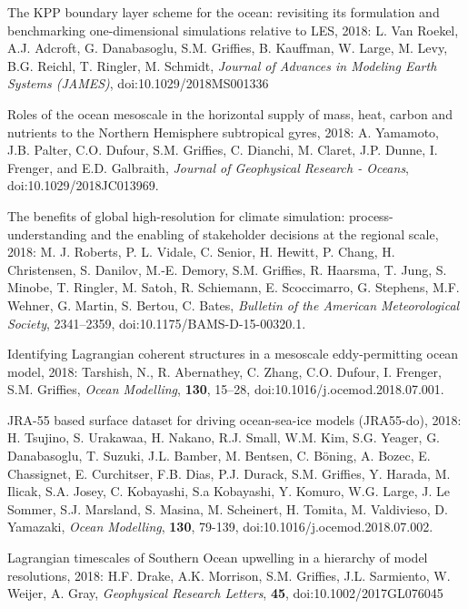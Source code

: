 \begin{etaremune}
\item The KPP boundary layer scheme for the ocean: revisiting its formulation and benchmarking one-dimensional simulations relative to LES,  2018: L. Van Roekel, A.J.  Adcroft, G. Danabasoglu, S.M. Grif\/f\/ies, B. Kauffman, W. Large, M. Levy, B.G. Reichl, T. Ringler, M. Schmidt, {\it Journal of Advances in Modeling Earth Systems (JAMES)}, doi:10.1029/2018MS001336

\item Roles of the ocean mesoscale in the horizontal supply of mass, heat, carbon and nutrients to the Northern Hemisphere subtropical gyres, 2018: A. Yamamoto, J.B. Palter, C.O. Dufour, S.M. Grif\/f\/ies, C. Dianchi, M. Claret, J.P. Dunne, I. Frenger, and E.D. Galbraith, {\it Journal of Geophysical Research - Oceans},  doi:10.1029/2018JC013969.

\item The benefits of global high-resolution for climate simulation: process-understanding and the enabling of stakeholder decisions at the regional scale, 2018: M. J. Roberts, P. L. Vidale, C. Senior, H. Hewitt, P. Chang, H. Christensen, S. Danilov, M.-E. Demory, S.M. Grif\/f\/ies, R. Haarsma, T. Jung, S. Minobe, T. Ringler, M. Satoh, R. Schiemann, E. Scoccimarro, G. Stephens, M.F. Wehner, G. Martin, S. Bertou, C. Bates, {\it Bulletin of the American Meteorological Society}, 2341--2359, doi:10.1175/BAMS-D-15-00320.1. 

\item Identifying Lagrangian coherent structures in a mesoscale eddy-permitting ocean model, 2018: Tarshish, N., R. Abernathey, C. Zhang, C.O. Dufour, I. Frenger, S.M. Grif\/f\/ies, \textit{Ocean Modelling}, {\bf 130}, 15--28, doi:10.1016/j.ocemod.2018.07.001.

\item JRA-55 based surface dataset for driving ocean-sea-ice models (JRA55-do), 2018: H. Tsujino, S. Urakawaa, H. Nakano, R.J. Small, W.M. Kim, S.G. Yeager, G. Danabasoglu, T. Suzuki, J.L. Bamber, M. Bentsen, C. {B\"{o}ning}, A. Bozec, E. Chassignet, E. Curchitser, F.B. Dias, P.J. Durack, S.M. Grif\/f\/ies, Y. Harada, M. Ilicak, S.A. Josey, C. Kobayashi, S.a Kobayashi, Y. Komuro, W.G. Large, J. {Le Sommer}, S.J. Marsland, S. Masina, M. Scheinert, H. Tomita, M. Valdivieso, D. Yamazaki, {\it Ocean Modelling},  {\bf 130}, 79-139, doi:10.1016/j.ocemod.2018.07.002.

\item Lagrangian timescales of Southern Ocean upwelling in a hierarchy of model resolutions, 2018: H.F. Drake, A.K. Morrison, S.M. Grif\/f\/ies, J.L. Sarmiento, W. Weijer, A. Gray, {\it  Geophysical Research Letters}, {\bf 45}, doi:10.1002/2017GL076045


\end{etaremune}
